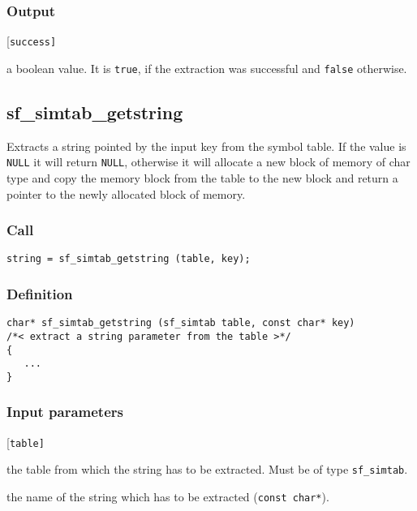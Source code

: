 \subsubsection*{Output}
\begin{desclist}{\tt }{\quad}[\tt success]
   \setlength\itemsep{0pt}
   \item[success] a boolean value. It is \texttt{true}, if the extraction was successful and \texttt{false} otherwise.
\end{desclist}




\subsection{{sf\_simtab\_getstring}}\label{sec:sf_simtab_getstring}
Extracts a string pointed by the input key from the symbol table. If the value is \texttt{NULL} it will return \texttt{NULL}, otherwise it will allocate a new block of memory of char type and copy the memory block from the table to the new block and return a pointer to the newly allocated block of memory. 

\subsubsection*{Call}
\begin{verbatim}string = sf_simtab_getstring (table, key);\end{verbatim}

\subsubsection*{Definition}
\begin{verbatim}
char* sf_simtab_getstring (sf_simtab table, const char* key) 
/*< extract a string parameter from the table >*/
{
   ...
}
\end{verbatim}

\subsubsection*{Input parameters}
\begin{desclist}{\tt }{\quad}[\tt table]
   \setlength\itemsep{0pt}
   \item[table] the table from which the string has to be extracted. Must be of type \texttt{sf\_simtab}.
   \item[key]   the name of the string which has to be extracted (\texttt{const char*}).
\end{desclist}

